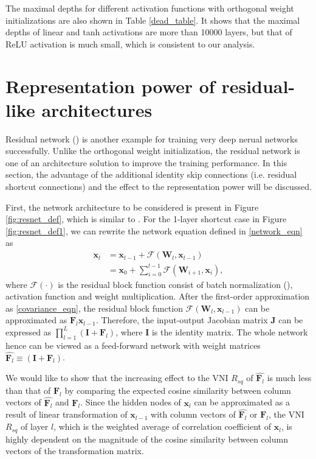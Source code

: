 The maximal depths for different activation functions with orthogonal weight initializations
are also shown in Table \ref{dead_table}. It shows that the maximal depths of linear and tanh
activations are more than 10000 layers, but that of ReLU activation is much small, which is
consistent to our analysis.

\section{Representation power of residual-like architectures} \label{repr_residual}

Residual network (\cite{resnet1, resnet2}) is another example for training very deep nerual
networks successfully.
Unlike the orthogonal weight initialization, the residual network is one of an architecture
solution to improve the training performance. In this section, the advantage of the 
additional identity skip connections (i.e. residual shortcut connections) and the effect
to the representation power will be discussed.

First, the network architecture to be considered is present in Figure \ref{fig:resnet_def}, which is
similar to \cite{resnet2}. For the 1-layer shortcut case in Figure \ref{fig:resnet_def1}, we can
rewrite the network equation defined in \eqref{network_eqn} as
\begin{equation}
    \begin{aligned}
        \mathbf{x}_{l}&=\mathbf{x}_{l-1} + \mathcal{F}(\mathbf{W}_l, \mathbf{x}_{l-1})\\
        &=\mathbf{x}_{0} + \sum_{i=0}^{l-1}\mathcal{F}(\mathbf{W}_{i+1}, \mathbf{x}_{i}),
    \end{aligned}
\label{resnet_eqn}
\end{equation}
where $\mathcal{F}(\cdot)$ is the residual block function consist of batch normalization
(\cite{batchnorm}), activation function and weight multiplication.
After the first-order approximation as \eqref{covariance_eqn}, the residual block function
$\mathcal{F}(\mathbf{W}_l, \mathbf{x}_{l-1})$ can be approximated as $\mathbf{F}_l\mathbf{x}_{l-1}$.
Therefore, the input-output Jacobian matrix $\mathbf{J}$ can be expressed as
$\prod_{l=1}^{L}(\mathbf{I}+\mathbf{F}_l)$, where $\mathbf{I}$ is the identity matrix.
The whole network hence can be viewed as a feed-forward network with weight matrices
$\widehat{\mathbf{F}_l}\equiv(\mathbf{I}+\mathbf{F}_l)$. 

We would like to show that the increasing effect to the VNI $R_{sq}$ 
of $\widehat{\mathbf{F}_l}$ is much less than that of $\mathbf{F}_l$
by comparing the expected cosine similarity between column vectors of 
$\widehat{\mathbf{F}_l}$ and $\mathbf{F}_l$.
Since the hidden nodes of $\mathbf{x}_l$ can be approximated as a result of linear transformation of
$\mathbf{x}_{l-1}$ with column vectors of $\widehat{\mathbf{F}_l}$ or $\mathbf{F}_l$,
the VNI $R_{sq}$ of layer $l$, which is the weighted average of correlation coefficient of
$\mathbf{x}_l$, is highly dependent on the magnitude of the cosine similarity between column vectors
of the transformation matrix.

